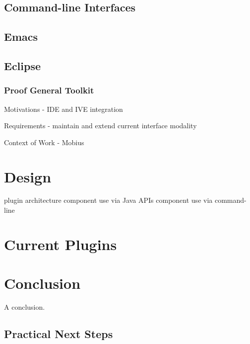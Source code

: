 \documentclass{entcs}
\begin{document}
\subsection{Command-line Interfaces}

\subsection{Emacs}

\subsection{Eclipse}

\subsubsection{Proof General Toolkit}

Motivations - IDE and IVE integration

Requirements - maintain and extend current interface modality

Context of Work - Mobius

\section{Design}

plugin architecture
component use via Java APIs
component use via command-line


\section{Current Plugins}



\section{Conclusion}

A conclusion.

\subsection{Practical Next Steps}
\end{document}
